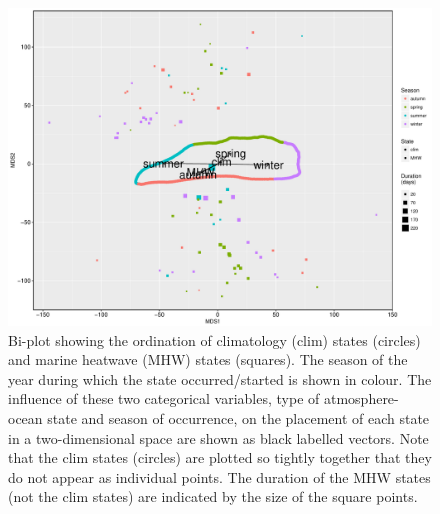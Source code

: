 \documentclass[utf8]{frontiersSCNS}
\begin{document}
\begin{figure}[]
\begin{center}
\includegraphics[width=1.0\textwidth]{figure_3.pdf}
\end{center}
\caption{Bi-plot showing the ordination of climatology (clim) states (circles) and marine heatwave (MHW) states (squares). The season of the year during which the state occurred/started is shown in colour. The influence of these two categorical variables, type of atmosphere-ocean state and season of occurrence, on the placement of each state in a two-dimensional space are shown as black labelled vectors. Note that the clim states (circles) are plotted so tightly together that they do not appear as individual points. The duration of the MHW states (not the clim states) are indicated by the size of the square points.}
\label{figure3}
\end{figure}
\end{document}
